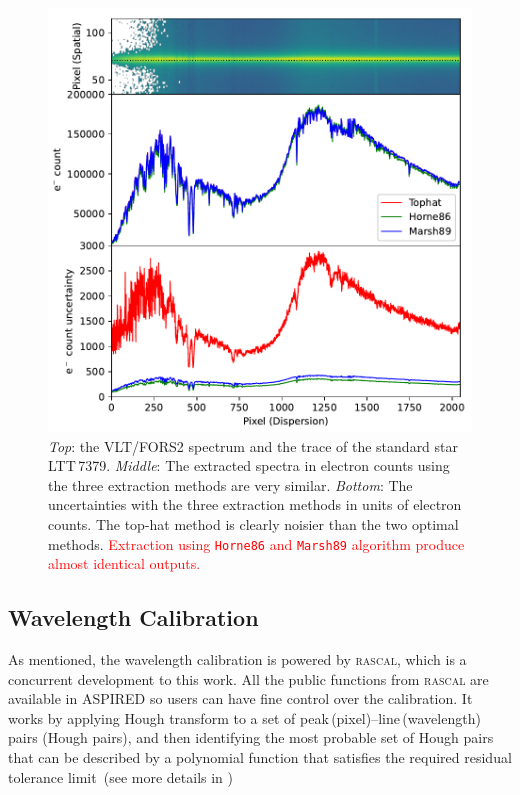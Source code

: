 \documentclass[linenumbers, twocolumn]{aastex631}
\begin{document}
\begin{figure}
    \centering
    \includegraphics[width=\columnwidth]{fig_04_extraction_compared.pdf}
    \caption{\textit{Top}: the VLT/FORS2 spectrum and the trace of the standard
    star LTT\,7379. \textit{Middle}: The extracted spectra in electron counts
    using the three extraction methods are very similar. \textit{Bottom}: The
    uncertainties with the three extraction methods in units of electron counts.
    The top-hat method is clearly noisier than the two optimal methods.
    \textcolor{red}{Extraction using \texttt{Horne86} and \texttt{Marsh89} algorithm produce
    almost identical outputs.}}
    \label{fig:extraction_compared}
\end{figure}

\subsection{Wavelength Calibration}
As mentioned, the wavelength calibration is powered by \textsc{rascal}, which is
a concurrent development to this work. All the public functions from
\textsc{rascal} are available in \textsc{ASPIRED} so users can have fine control
over the calibration. It works by applying Hough transform to a set of
peak\,(pixel)--line\,(wavelength) pairs (Hough pairs), and then identifying the
most probable set of Hough pairs that can be described by a polynomial
function that satisfies the required residual tolerance limit~(see more
details in \citealt{2020ASPC..527..627V})
\end{document}
